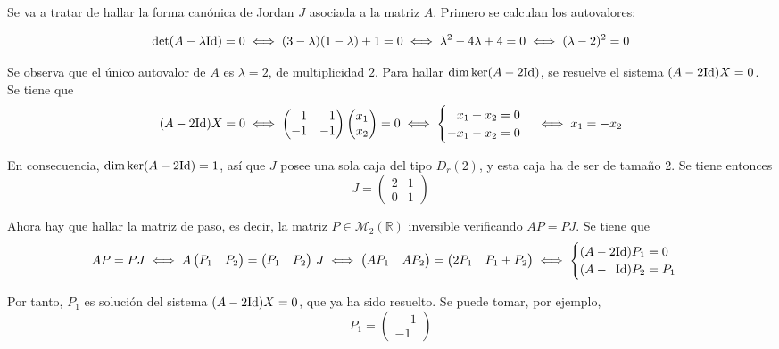 \documentclass[11pt]{report}
\newcommand{\R}{\mathbb R}
\begin{document}
\vspace{2mm}

Se va a tratar de hallar la forma canónica de Jordan  $J$ asociada a la matriz $A$. Primero se calculan los autovalores:

\[\textup{det}(A-\lambda \textup{Id})=0 \iff (3-\lambda)(1-\lambda)+1=0 \iff \lambda^2-4\lambda+4=0 \iff (\lambda-2)^2=0\]

Se observa que el único autovalor de $A$ es $\lambda=2$, de multiplicidad $2$. Para hallar $\textup{dim} \,\textup{ker}(A-2\textup{Id})$, se resuelve el sistema $(A-2\textup{Id})X=0$. Se tiene que
\[(A-2\textup{Id})X=0 \iff \begin{pmatrix}
    \phantom{-}1 & \phantom{-}1 \\
    -1 & -1
\end{pmatrix}\begin{pmatrix}
    x_1 \\
    x_2
\end{pmatrix}=0 \iff \begin{cases}
    \phantom{-}x_1+x_2=0 \\
    -x_1-x_2=0
\end{cases} \iff x_1=-x_2\]

En consecuencia, $\textup{dim} \,\textup{ker}(A-2\textup{Id})=1$, así que $J$ posee una sola caja del tipo $D_r(2)$, y esta caja ha de ser de tamaño 2. Se tiene entonces
\[J=\begin{pmatrix}
    2 & 1 \\
    0 & 1
\end{pmatrix}\]

Ahora hay que hallar la matriz de paso, es decir, la matriz $P \in \mathcal{M}_2(\R)$ inversible verificando $AP=PJ$. Se tiene que
\[AP=PJ \iff A\begin{pmatrix}
    P_1 & P_2
\end{pmatrix}=\begin{pmatrix}
    P_1 & P_2
\end{pmatrix}\, J \iff \begin{pmatrix}
    AP_1 & AP_2
\end{pmatrix} = \begin{pmatrix}
    2P_1 & P_1+P_2
\end{pmatrix} \iff \begin{cases}
    (A-2\textup{Id})P_1=0 \\
    (A-\phantom{2}\textup{Id})P_2=P_1
\end{cases}\]

Por tanto, $P_1$ es solución del sistema $(A-2\textup{Id})X=0$, que ya ha sido resuelto. Se puede tomar, por ejemplo,
\[P_1=\begin{pmatrix}
    \phantom{-}1 \\
    -1
\end{pmatrix}\]
\end{document}
